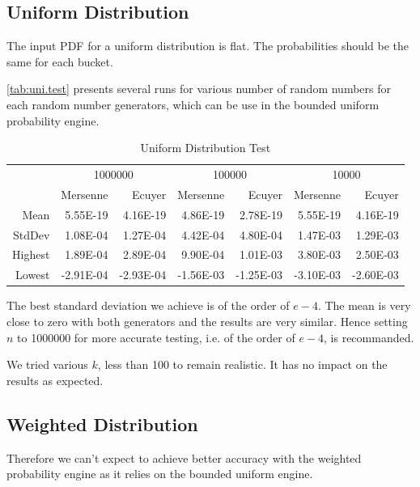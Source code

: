 \documentclass[12pt,a4paper,article]{memoir} %
\begin{document}
\subsection{Uniform Distribution}

The input PDF for a uniform distribution is flat. The probabilities
should be the same for each bucket. 

\autoref{tab:uni.test} presents several runs for various number of random
numbers for each random number generators, which can be use in
the bounded uniform probability engine.
\begin{table}[htbp!]
  \centering \tiny
    \begin{tabular}{r|rrrrrr}
    \multicolumn{1}{r}{} & \multicolumn{2}{c}{1000000} & \multicolumn{2}{c}{100000} & \multicolumn{2}{c}{10000} \\
    \multicolumn{1}{r}{} & Mersenne & Ecuyer & Mersenne & Ecuyer & Mersenne & Ecuyer \\
\cmidrule{2-7}    Mean  & 5.55E-19 & 4.16E-19 & 4.86E-19 & 2.78E-19 & 5.55E-19 & 4.16E-19 \\
    StdDev  & 1.08E-04 & 1.27E-04 & 4.42E-04 & 4.80E-04 & 1.47E-03 & 1.29E-03 \\
    Highest  & 1.89E-04 & 2.89E-04 & 9.90E-04 & 1.01E-03 & 3.80E-03 & 2.50E-03 \\
    Lowest  & -2.91E-04 & -2.93E-04 & -1.56E-03 & -1.25E-03 & -3.10E-03 & -2.60E-03 \\
    \end{tabular}%
  \caption{Uniform Distribution Test}
  \label{tab:uni.test}%
\end{table}%

The best standard deviation we achieve is of the order of $e-4$.
The mean is very close to zero with both generators and the results 
are very similar.
Hence setting $n$ to 1000000 for more accurate testing, 
i.e. of the order of $e-4$, is recommanded.

We tried various $k$, less than 100 to remain realistic. It has no impact on the
results as expected.

\subsection{Weighted Distribution}

Therefore we can't expect to achieve better accuracy with the
weighted probability engine as it relies on the bounded uniform engine.
\end{document}
